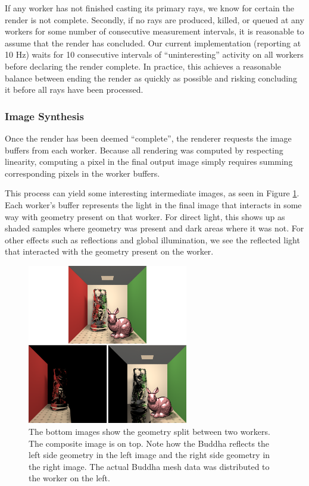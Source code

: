 \documentclass[a4paper,twoside]{article}
\begin{document}
If any worker has not finished casting its primary rays, we know for certain the
render is not complete. Secondly, if no rays are produced, killed, or queued at
any workers for some number of consecutive measurement intervals, it is
reasonable to assume that the render has concluded. Our current implementation
(reporting at 10 Hz) waits for 10 consecutive intervals of ``uninteresting''
activity on all workers before declaring the render complete. In practice, this
achieves a reasonable balance between ending the render as quickly as possible
and risking concluding it before all rays have been processed.

\subsubsection{Image Synthesis}
\label{synthesis}

Once the render has been deemed ``complete'', the renderer requests the image
buffers from each worker. Because all rendering was computed by respecting
linearity, computing a pixel in the final output image simply requires summing
corresponding pixels in the worker buffers.

This process can yield some interesting intermediate images, as seen in Figure
\ref{fig:linearity}. Each worker's buffer represents the light in the final
image that interacts in some way with geometry present on that worker. For
direct light, this shows up as shaded samples where geometry was present and
dark areas where it was not. For other effects such as reflections and global
illumination, we see the reflected light that interacted with the geometry
present on the worker.

\begin{figure}[h!]
    \centering
    \includegraphics[width=70mm]{images/linearity.png}
    \caption{The bottom images show the geometry split between two workers. The composite image is on top. Note how the Buddha reflects the left side geometry in the left image and the right side geometry in the right image. The actual Buddha mesh data was distributed to the worker on the left.}
    \label{fig:linearity}
\end{figure}
\end{document}
